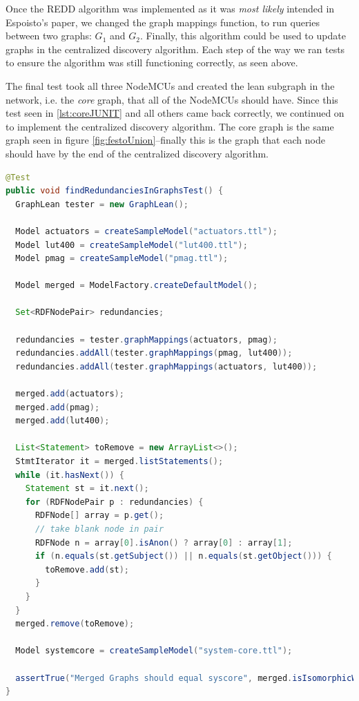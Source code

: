 Once the REDD algorithm was implemented as it was \textit{most likely} intended in Espoisto's paper, we changed the graph mappings function, to run queries between two graphs: $G_1$ and $G_2$. Finally, this algorithm could be used to update graphs in the centralized discovery algorithm. Each step of the way we ran tests to ensure the algorithm was still functioning correctly, as seen above.

The final test took all three NodeMCUs and created the lean subgraph in the network, i.e. the \textit{core} graph, that all of the NodeMCUs should have. Since this test seen in \ref{lst:coreJUNIT} and all others came back correctly, we continued on to implement the centralized discovery algorithm. The core graph is the same graph seen in figure \ref{fig:festoUnion}--finally this is the graph that each node should have by the end of the centralized discovery algorithm.

\begin{lstlisting}[language=java, caption={The final test, which checked that the semantic data was being connected, as previously expected.}, label={lst:coreJUNIT}, tabsize=2, breaklines=true, frame=single]
@Test
public void findRedundanciesInGraphsTest() {
  GraphLean tester = new GraphLean();

  Model actuators = createSampleModel("actuators.ttl");
  Model lut400 = createSampleModel("lut400.ttl");
  Model pmag = createSampleModel("pmag.ttl");

  Model merged = ModelFactory.createDefaultModel();

  Set<RDFNodePair> redundancies;

  redundancies = tester.graphMappings(actuators, pmag);
  redundancies.addAll(tester.graphMappings(pmag, lut400));
  redundancies.addAll(tester.graphMappings(actuators, lut400));

  merged.add(actuators);
  merged.add(pmag);
  merged.add(lut400);

  List<Statement> toRemove = new ArrayList<>();
  StmtIterator it = merged.listStatements();
  while (it.hasNext()) {
    Statement st = it.next();
    for (RDFNodePair p : redundancies) {
      RDFNode[] array = p.get();
      // take blank node in pair
      RDFNode n = array[0].isAnon() ? array[0] : array[1];
      if (n.equals(st.getSubject()) || n.equals(st.getObject())) {
        toRemove.add(st);
      }
    }
  }
  merged.remove(toRemove);

  Model systemcore = createSampleModel("system-core.ttl");

  assertTrue("Merged Graphs should equal syscore", merged.isIsomorphicWith(systemcore));
}
\end{lstlisting}



